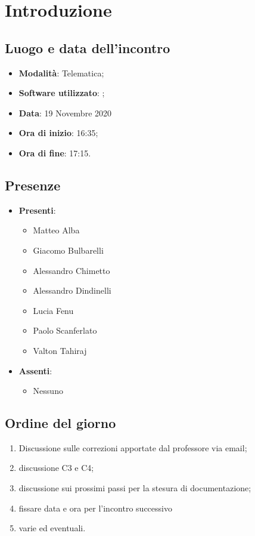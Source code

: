 \documentclass[]{article}
\begin{document}
	
	
	
	\newpage
	
	\section{Introduzione}
		\subsection{Luogo e data dell'incontro}
		\begin{itemize}
			\item \textbf{Modalità}: Telematica;
			\item \textbf{Software utilizzato}: ;
			\item \textbf{Data}: 19 Novembre 2020
			\item \textbf{Ora di inizio}: 16:35;
			\item \textbf{Ora di fine}: 17:15.
		\end{itemize}
		
		\subsection{Presenze}
		\begin{itemize}
			\item \textbf{Presenti}: 
			\begin{itemize}
				\item Matteo Alba
				\item Giacomo Bulbarelli
				\item Alessandro Chimetto
				\item Alessandro Dindinelli
				\item Lucia Fenu
				\item Paolo Scanferlato
				\item Valton Tahiraj
			\end{itemize}
			\item \textbf{Assenti}:
			\begin{itemize}
				\item Nessuno
			\end{itemize}
		\end{itemize}
		
		
		\subsection{Ordine del giorno}
		\begin{enumerate}
			\item Discussione sulle correzioni apportate dal professore via email;
			\item discussione  C3 e C4;
			\item discussione sui prossimi passi per la stesura di documentazione;
			\item fissare data e ora per l'incontro successivo
			\item varie ed eventuali.
		\end{enumerate}
\end{document}

